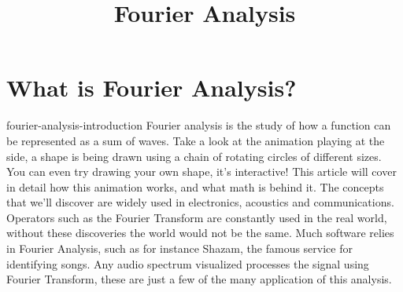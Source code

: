 \documentclass[preview]{standalone}
\begin{document}
\title{Fourier Analysis}
\genpage

\section{What is Fourier Analysis?}

\begin{snippet}{fourier-analysis-introduction}
    Fourier analysis is the study of how a function can be represented as a sum of waves. Take a look at the animation playing at the side, a shape is being drawn using a chain of rotating circles of different sizes. You can even try drawing your own shape, it's interactive! This article will cover in detail how this animation works, and what math is behind it. The concepts that we'll discover are widely used in electronics, acoustics and communications. Operators such as the Fourier Transform are constantly used in the real world, without these discoveries the world would not be the same. Much software relies in Fourier Analysis, such as for instance Shazam, the famous service for identifying songs. Any audio spectrum visualized processes the signal using Fourier Transform, these are just a few of the many application of this analysis.
\end{snippet}


\end{document}

